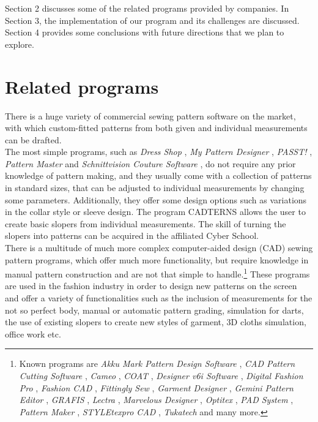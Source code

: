 \documentclass[10pt,letterpaper]{ltugboat}
\begin{document}
\par \justifying Section 2 discusses some of the related programs provided by companies. In Section 3, the implementation of our \MP { }program and its challenges are discussed. Section 4 provides some conclusions with future directions that we plan to explore.

\section{Related programs}
There is a huge variety of commercial sewing pattern software on the market, with which custom-fitted patterns from both given and individual measurements can be drafted.\\
The most simple programs, such as \textit{Dress Shop} \cite{livingsoftnw}, \textit{My Pattern Designer} \cite{mypatterndesigner}, \textit{PASST!} \cite{golden}, \textit{Pattern Master} \cite{wildginger} and \textit{Schnittvision Couture Software} \cite{schnittvision}, do not require any prior knowledge of pattern making, and they usually come with a collection of patterns in standard sizes, that can be adjusted to individual measurements by changing some parameters. Additionally, they offer some design options such as variations in the collar style or sleeve design. The program CADTERNS \cite{cadterns} allows the user to create basic slopers from individual measurements. The skill of turning the slopers into patterns can be acquired in the affiliated Cyber School.\\
There is a multitude of much more complex computer-aided design (CAD) sewing pattern programs, which offer much more functionality, but require knowledge in manual pattern construction and are not that simple to handle.\footnote{Known programs are \textit{Akku Mark Pattern Design Software} \cite{gerber}, \textit{CAD Pattern Cutting Software} \cite{telestia}, \textit{Cameo} \cite{wildginger}, \textit{COAT} \cite{coat}, \textit{Designer v6i Software} \cite{designsew}, \textit{Digital Fashion Pro} \cite{digitalfashion}, \textit{Fashion CAD} \cite{fashioncad}, \textit{Fittingly Sew} \cite{fittinglysew}, \textit{Garment Designer} \cite{garmentdesigner}, \textit{Gemini Pattern Editor} \cite{gemini}, \textit{GRAFIS} \cite{grafis}, \textit{Lectra} \cite{lectra}, \textit{Marvelous Designer} \cite{marvelousdesigner}, \textit{Optitex} \cite{optitex}, \textit{PAD System} \cite{padsystem}, \textit{Pattern Maker} \cite{patternmaker}, \textit{STYLEtexpro CAD} \cite{styletexpro}, \textit{Tukatech} \cite{tukatech} and many more.} These programs are used in the fashion industry in order to design new patterns on the screen and offer a variety of functionalities such as the inclusion of measurements for the not so perfect body, manual or automatic pattern grading, simulation for darts, the use of existing slopers to create new styles of garment, 3D cloths simulation, office work etc.\\
\end{document}
